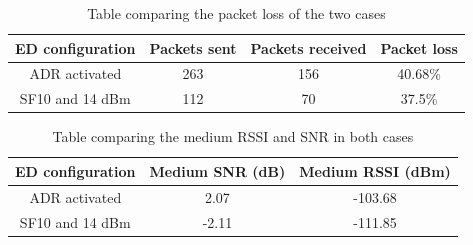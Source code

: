 \begin{table}[htpb]
    \centering
    \setlength{\arrayrulewidth}{0.5mm}
    \setlength{\tabcolsep}{18pt}
    \renewcommand{\arraystretch}{2}
    \begin{tabular}{|c|c|c|c|}
        \hline
         \cellcolor[HTML]{85C1E9}ED configuration & \cellcolor[HTML]{85C1E9}Packets sent & \cellcolor[HTML]{85C1E9}Packets received & \cellcolor[HTML]{85C1E9}Packet loss\\
         \hline
         ADR activated & 263 & 156 & 40.68\% \\
         SF10 and 14 dBm & 112 & 70 & 37.5\% \\
         \hline
    \end{tabular}
    \caption{Table comparing the packet loss of the two cases}
    \label{tab:packet_loss_exp1}
\end{table}

\begin{table}[htbp]
    \centering
    \setlength{\arrayrulewidth}{0.5mm}
    \setlength{\tabcolsep}{18pt}
    \renewcommand{\arraystretch}{2}
    \begin{tabular}{|c|c|c|}
        \hline
         \cellcolor[HTML]{85C1E9}ED configuration & \cellcolor[HTML]{85C1E9}Medium SNR (dB) & \cellcolor[HTML]{85C1E9}Medium RSSI (dBm)\\
         \hline
         ADR activated & 2.07 & -103.68 \\
         SF10 and 14 dBm & -2.11 & -111.85 \\
         \hline
    \end{tabular}
    \caption{Table comparing the medium RSSI and SNR in both cases}
    \label{tab:RSSI_SNR_ex}
\end{table}